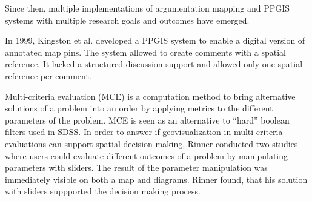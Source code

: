 Since then, multiple implementations of argumentation mapping and PPGIS systems with multiple research goals and outcomes have emerged.

In 1999, Kingston et al. \cite{kingston1999gis} developed a PPGIS system to enable a digital version of annotated map pins. The system allowed to create comments with a spatial reference. It lacked a structured discussion support and allowed only one spatial reference per comment.

Multi-criteria evaluation (MCE) is a computation method to bring alternative solutions of a problem into an order by applying metrics to the different parameters of the problem. MCE is seen as an alternative to ``hard'' boolean filters used in SDSS. In order to answer if geovisualization in multi-criteria evaluations can support spatial decision making, Rinner \cite{Rinner2007_geovis_decisionsupport} conducted two studies where users could evaluate different outcomes of a problem by manipulating parameters with sliders. The result of the parameter manipulation was immediately visible on both a map and diagrams. Rinner found, that his solution with sliders suppported the decision making process.

